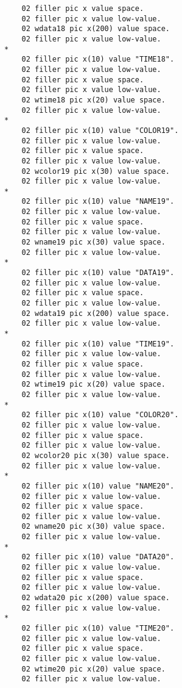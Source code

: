 {{{\begin{verbatim}
          02 filler pic x value space.
          02 filler pic x value low-value.
          02 wdata18 pic x(200) value space.
          02 filler pic x value low-value.
      *    
          02 filler pic x(10) value "TIME18".
          02 filler pic x value low-value.
          02 filler pic x value space.
          02 filler pic x value low-value.
          02 wtime18 pic x(20) value space.
          02 filler pic x value low-value.
      *    
          02 filler pic x(10) value "COLOR19".
          02 filler pic x value low-value.
          02 filler pic x value space.
          02 filler pic x value low-value.
          02 wcolor19 pic x(30) value space.
          02 filler pic x value low-value.
      *    
          02 filler pic x(10) value "NAME19".
          02 filler pic x value low-value.
          02 filler pic x value space.
          02 filler pic x value low-value.
          02 wname19 pic x(30) value space.
          02 filler pic x value low-value.
      *    
          02 filler pic x(10) value "DATA19".
          02 filler pic x value low-value.
          02 filler pic x value space.
          02 filler pic x value low-value.
          02 wdata19 pic x(200) value space.
          02 filler pic x value low-value.
      *    
          02 filler pic x(10) value "TIME19".
          02 filler pic x value low-value.
          02 filler pic x value space.
          02 filler pic x value low-value.
          02 wtime19 pic x(20) value space.
          02 filler pic x value low-value.
      *    
          02 filler pic x(10) value "COLOR20".
          02 filler pic x value low-value.
          02 filler pic x value space.
          02 filler pic x value low-value.
          02 wcolor20 pic x(30) value space.
          02 filler pic x value low-value.
      *    
          02 filler pic x(10) value "NAME20".
          02 filler pic x value low-value.
          02 filler pic x value space.
          02 filler pic x value low-value.
          02 wname20 pic x(30) value space.
          02 filler pic x value low-value.
      *    
          02 filler pic x(10) value "DATA20".
          02 filler pic x value low-value.
          02 filler pic x value space.
          02 filler pic x value low-value.
          02 wdata20 pic x(200) value space.
          02 filler pic x value low-value.
      *    
          02 filler pic x(10) value "TIME20".
          02 filler pic x value low-value.
          02 filler pic x value space.
          02 filler pic x value low-value.
          02 wtime20 pic x(20) value space.
          02 filler pic x value low-value.

\end{verbatim}}}}
